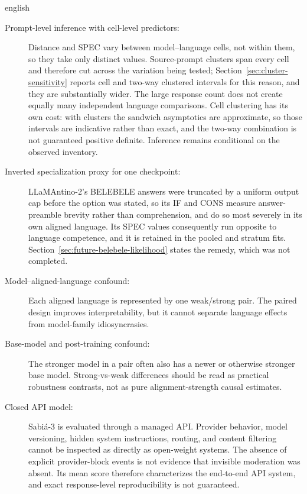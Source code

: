 \begin{otherlanguage*}{english}
\begin{description}
    \item[Prompt-level inference with cell-level predictors:] Distance and SPEC vary between model--language cells, not within them, so they take only \RNumCells{} distinct values. Source-prompt clusters span every cell and therefore cut across the variation being tested; Section~\ref{sec:cluster-sensitivity} reports cell and two-way clustered intervals for this reason, and they are substantially wider. The large response count does not create equally many independent language comparisons. Cell clustering has its own cost: with \RNumCells{} clusters the sandwich asymptotics are approximate, so those intervals are indicative rather than exact, and the two-way combination is not guaranteed positive definite. Inference remains conditional on the observed inventory.

    \item[Inverted specialization proxy for one checkpoint:] LLaMAntino-2's BELEBELE answers were truncated by a uniform output cap before the option was stated, so its IF and CONS measure answer-preamble brevity rather than comprehension, and do so most severely in its own aligned language. Its SPEC values consequently run opposite to language competence, and it is retained in the pooled and stratum fits. Section~\ref{sec:future-belebele-likelihood} states the remedy, which was not completed.

    \item[Model--aligned-language confound:] Each aligned language is represented by one weak/strong pair. The paired design improves interpretability, but it cannot separate language effects from model-family idiosyncrasies.

    \item[Base-model and post-training confound:] The stronger model in a pair often also has a newer or otherwise stronger base model. Strong-vs-weak differences should be read as practical robustness contrasts, not as pure alignment-strength causal estimates.

    \item[Closed API model:] Sabiá-3 is evaluated through a managed API. Provider behavior, model versioning, hidden system instructions, routing, and content filtering cannot be inspected as directly as open-weight systems. The absence of explicit provider-block events is not evidence that invisible moderation was absent. Its mean score therefore characterizes the end-to-end API system, and exact response-level reproducibility is not guaranteed.


\end{description}
\end{otherlanguage*}
